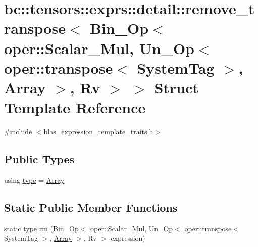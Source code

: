 \hypertarget{structbc_1_1tensors_1_1exprs_1_1detail_1_1remove__transpose_3_01Bin__Op_3_01oper_1_1Scalar__Mul_6b5c3eb4d56201d2dc306da5aaee0671}{}\section{bc\+:\+:tensors\+:\+:exprs\+:\+:detail\+:\+:remove\+\_\+transpose$<$ Bin\+\_\+\+Op$<$ oper\+:\+:Scalar\+\_\+\+Mul, Un\+\_\+\+Op$<$ oper\+:\+:transpose$<$ System\+Tag $>$, Array $>$, Rv $>$ $>$ Struct Template Reference}
\label{structbc_1_1tensors_1_1exprs_1_1detail_1_1remove__transpose_3_01Bin__Op_3_01oper_1_1Scalar__Mul_6b5c3eb4d56201d2dc306da5aaee0671}


{\ttfamily \#include $<$blas\+\_\+expression\+\_\+template\+\_\+traits.\+h$>$}

\subsection*{Public Types}
\begin{DoxyCompactItemize}
\item 
using \hyperlink{structbc_1_1tensors_1_1exprs_1_1detail_1_1remove__transpose_3_01Bin__Op_3_01oper_1_1Scalar__Mul_6b5c3eb4d56201d2dc306da5aaee0671_a6df30413d6a3880290da00eb4995cb09}{type} = \hyperlink{structbc_1_1tensors_1_1exprs_1_1Array}{Array}
\end{DoxyCompactItemize}
\subsection*{Static Public Member Functions}
\begin{DoxyCompactItemize}
\item 
static \hyperlink{structbc_1_1tensors_1_1exprs_1_1detail_1_1remove__transpose_3_01Bin__Op_3_01oper_1_1Scalar__Mul_6b5c3eb4d56201d2dc306da5aaee0671_a6df30413d6a3880290da00eb4995cb09}{type} \hyperlink{structbc_1_1tensors_1_1exprs_1_1detail_1_1remove__transpose_3_01Bin__Op_3_01oper_1_1Scalar__Mul_6b5c3eb4d56201d2dc306da5aaee0671_a6abb48ea73f3f032d6ca99bc794c558d}{rm} (\hyperlink{structbc_1_1tensors_1_1exprs_1_1Bin__Op}{Bin\+\_\+\+Op}$<$ \hyperlink{structbc_1_1oper_1_1Scalar__Mul}{oper\+::\+Scalar\+\_\+\+Mul}, \hyperlink{structbc_1_1tensors_1_1exprs_1_1Un__Op}{Un\+\_\+\+Op}$<$ \hyperlink{structbc_1_1oper_1_1transpose}{oper\+::transpose}$<$ System\+Tag $>$, \hyperlink{structbc_1_1tensors_1_1exprs_1_1Array}{Array} $>$, Rv $>$ expression)
\end{DoxyCompactItemize}


